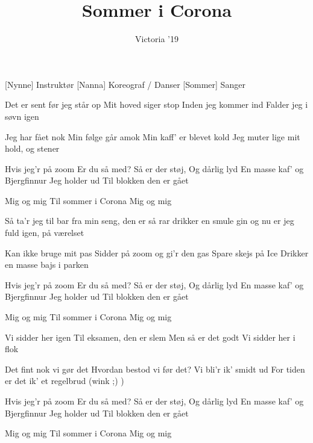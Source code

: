 \documentclass[a4paper,11pt]{article}
\title{Sommer i Corona}
\author{Victoria '19}
\begin{document}
\maketitle

\begin{roles}
[Nynne] Instruktør
[Nanna] Koreograf / Danser
[Sommer] Sanger
\end{roles}

\begin{song}
 Det er sent før jeg står op
Mit hoved siger stop
Inden jeg kommer ind
Falder jeg i søvn igen

 Jeg har fået nok
Min følge går amok
Min kaff' er blevet kold
Jeg muter lige mit hold, og stener

 Hvis jeg'r på zoom
Er du så med?
Så er der støj,
Og dårlig lyd
En masse kaf'
og Bjergfinnur
Jeg holder ud
Til blokken den er gået

Mig og mig
Til sommer i Corona
Mig og mig

 Så ta'r jeg til bar
fra min seng, den er så rar
drikker en smule gin
og nu er jeg fuld igen, på værelset

 Kan ikke bruge mit pas
Sidder på zoom og gi'r den gas
Spare skejs på Ice
Drikker en masse bajs
i parken

Hvis jeg'r på zoom
Er du så med?
Så er der støj,
Og dårlig lyd
En masse kaf'
og Bjergfinnur
Jeg holder ud
Til blokken den er gået

Mig og mig
Til sommer i Corona
Mig og mig

 Vi sidder her igen
Til eksamen, den er slem
Men så er det godt
Vi sidder her i flok

 Det fint nok vi gør det
Hvordan bestod vi før det?
Vi bli'r ik' smidt ud
For tiden er det ik' et regelbrud (wink ;) )

 Hvis jeg'r på zoom
Er du så med?
Så er der støj,
Og dårlig lyd
En masse kaf'
og Bjergfinnur
Jeg holder ud
Til blokken den er gået

Mig og mig
Til sommer i Corona
Mig og mig
\end{song}
\end{document}
